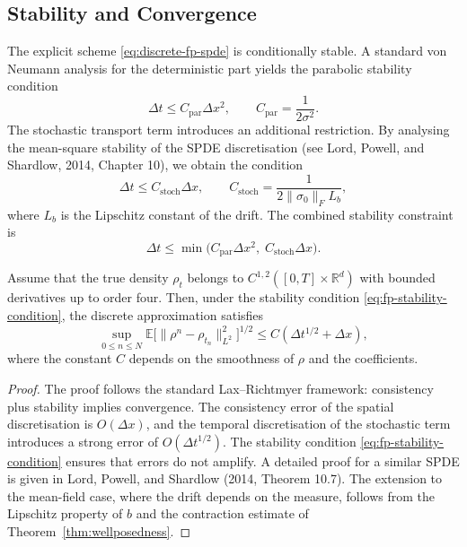\subsection{Stability and Convergence}

The explicit scheme \eqref{eq:discrete-fp-spde} is conditionally stable. A standard
von Neumann analysis for the deterministic part yields the parabolic stability
condition
\[
    \Delta t \leq C_{\mathrm{par}} \Delta x^2, \qquad C_{\mathrm{par}} =
    \frac{1}{2\sigma^2}.
\]
The stochastic transport term introduces an additional restriction. By analysing the
mean-square stability of the SPDE discretisation (see Lord, Powell, and Shardlow,
2014, Chapter 10), we obtain the condition
\[
    \Delta t \leq C_{\mathrm{stoch}} \Delta x, \qquad C_{\mathrm{stoch}} =
    \frac{1}{2\|\sigma_0\|_F L_b},
\]
where $L_b$ is the Lipschitz constant of the drift. The combined stability constraint
is
\begin{equation}
    \Delta t \leq \min\big( C_{\mathrm{par}} \Delta x^2, \; C_{\mathrm{stoch}} \Delta x
    \big).
    \label{eq:fp-stability-condition}
\end{equation}

\begin{theorem}
\label{thm:fd-convergence}
Assume that the true density $\rho_t$ belongs to $C^{1,2}([0,T] \times \mathbb{R}^d)$
with bounded derivatives up to order four. Then, under the stability condition
\eqref{eq:fp-stability-condition}, the discrete approximation satisfies
\[
    \sup_{0 \leq n \leq N} \mathbb{E}\big[ \|\rho^n - \rho_{t_n}\|_{L^2}^2 \big]^{1/2}
    \leq C(\Delta t^{1/2} + \Delta x),
\]
where the constant $C$ depends on the smoothness of $\rho$ and the coefficients.
\end{theorem}

\begin{proof}
The proof follows the standard Lax--Richtmyer framework: consistency plus stability
implies convergence. The consistency error of the spatial discretisation is
$O(\Delta x)$, and the temporal discretisation of the stochastic term introduces a
strong error of $O(\Delta t^{1/2})$. The stability condition
\eqref{eq:fp-stability-condition} ensures that errors do not amplify. A detailed proof
for a similar SPDE is given in Lord, Powell, and Shardlow (2014, Theorem 10.7). The
extension to the mean-field case, where the drift depends on the measure, follows from
the Lipschitz property of $b$ and the contraction estimate of
Theorem~\ref{thm:wellposedness}.
\end{proof}

